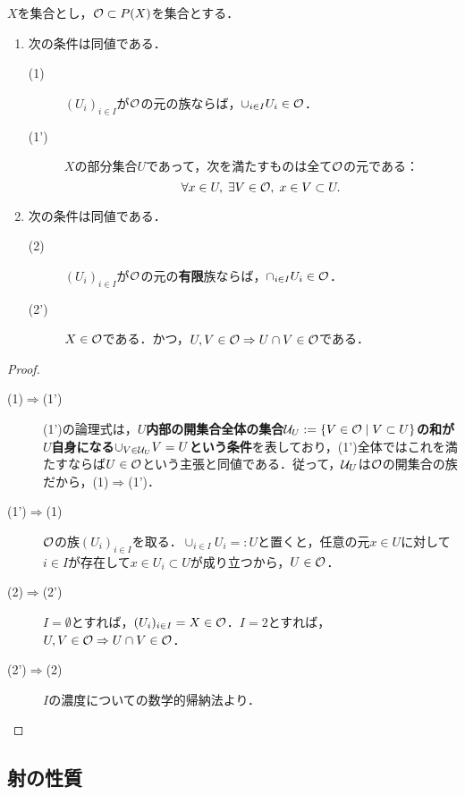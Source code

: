 \documentclass[uplatex,dvipdfmx]{jsreport}
\begin{document}
\begin{proposition}[開集合の公理の特徴付け]\label{prop-characterization-of-open-sets}
    $X$を集合とし，$\mathcal{O}\subset P(X)$を集合とする．
    \begin{enumerate}
        \item 次の条件は同値である．\begin{description}
            \item[(1)] $(U_i)_{i\in I}$が$\mathcal{O}$の元の族ならば，$\cup_{i\in I}U_i\in\mathcal{O}$．
            \item[(1')] $X$の部分集合$U$であって，次を満たすものは全て$\mathcal{O}$の元である：\[\forall x\in U,\; \exists V\in\mathcal{O},\;x\in V\subset U.\]
        \end{description}
        \item 次の条件は同値である．\begin{description}
            \item[(2)] $(U_i)_{i\in I}$が$\mathcal{O}$の元の\textbf{有限}族ならば，$\cap_{i\in I}U_i\in\mathcal{O}$．
            \item[(2')] $X\in\mathcal{O}$である．かつ，$U,V\in\mathcal{O}\Rightarrow U\cap V\in\mathcal{O}$である．
        \end{description}
    \end{enumerate}
\end{proposition}
\begin{proof}\mbox{}
    \begin{description}
        \item[(1)$\Rightarrow$(1')] (1')の論理式は，\textbf{$U$内部の開集合全体の集合$\mathcal{U}_U:=\{V\in\mathcal{O}\mid V\subset U\}$の和が$U$自身になる$\cup_{V\in\mathcal{U}_U}V=U$という条件}を表しており，(1')全体ではこれを満たすならば$U\in\mathcal{O}$という主張と同値である．従って，$\mathcal{U}_U$は$\mathcal{O}$の開集合の族だから，(1)$\Rightarrow$(1')．
        \item[(1')$\Rightarrow$(1)] $\mathcal{O}$の族$(U_i)_{i\in I}$を取る．$\cup_{i\in I}U_i=:U$と置くと，任意の元$x\in U$に対して$i\in I$が存在して$x\in U_i\subset U$が成り立つから，$U\in\mathcal{O}$．
        \item[(2)$\Rightarrow$(2')] $I=\emptyset$とすれば，$(U_i)_{i\in I}=X\in\mathcal{O}$．$I=2$とすれば，$U,V\in\mathcal{O}\Rightarrow U\cap V\in\mathcal{O}$．
        \item[(2')$\Rightarrow$(2)] $I$の濃度についての数学的帰納法より．
    \end{description}
\end{proof}

\subsection{射の性質}
\end{document}
